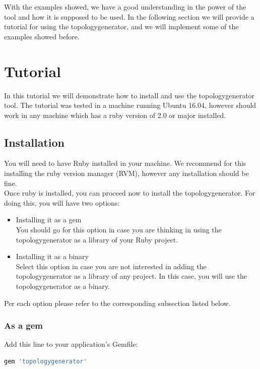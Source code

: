 With the examples showed, we have a good understanding in the power of the tool and how it is supposed to be used. In the following section we will provide a tutorial for using the topologygenerator, and we will implement some of the examples showed before.

\section{Tutorial}

In this tutorial we will demonstrate how to install and use the topologygenerator tool. The tutorial was tested in a machine running Ubuntu 16.04, however should work in any machine which has a ruby version of 2.0 or major installed. \\

\subsection{Installation}

You will need to have Ruby installed in your machine. We recommend for this installing the ruby version manager (RVM), however any installation should be fine.\\

Once ruby is installed, you can proceed now to install the topologygenerator. For doing this, you will have two options: 
\begin{itemize}
\item Installing it as a gem \\
You should go for this option in case you are thinking in using the topologygenerator as a library of your Ruby project. 
\item Installing it as a binary \\
Select this option in case you are not interested in adding the topologygenerator as a library of any project. In this case, you will use the topologygenerator as a binary.
\end{itemize}

Per each option please refer to the corresponding subsection listed below.

\subsubsection{As a gem}

Add this line to your application's Gemfile:

\begin{lstlisting}[language=Ruby,breaklines=true]
gem 'topologygenerator'
\end{lstlisting}

